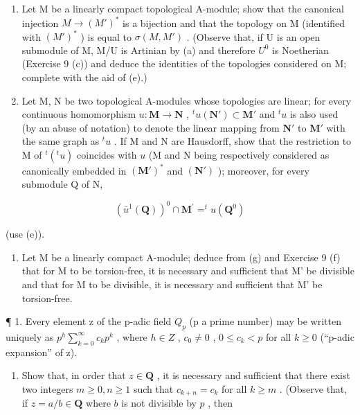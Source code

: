 \begin{enumerate}
\def\labelenumi{(\alph{enumi})}
\setcounter{enumi}{5}
\item
  Let M be a linearly compact topological A-module; show that the canonical injection \(M \rightarrow (M')^{*}\) is a bijection and that the topology on M (identified with \((M')^{*}\) ) is equal to \(\sigma(M, M')\) . (Observe that, if U is an open submodule of M, M/U is Artinian by (a) and therefore \(U^{0}\) is Noetherian (Exercise 9 (c)) and deduce the identities of the topologies considered on M; complete with the aid of (e).)
\item
  Let M, N be two topological A-modules whose topologies are linear; for every continuous homomorphism \(u \colon \mathbf{M} \to \mathbf{N}\) , \(^t u(\mathbf{N}') \subset \mathbf{M}'\) and \(^t u\) is also used (by an abuse of notation) to denote the linear mapping from \(\mathbf{N}'\) to \(\mathbf{M}'\) with the same graph as \(^t u\) . If M and N are Hausdorff, show that the restriction to M of \(^t (^t u)\) coincides with \(u\) (M and N being respectively considered as canonically embedded in \((\mathbf{M}')^*\) and \((\mathbf{N}')\) ); moreover, for every submodule Q of N,
\end{enumerate}

\[
(\bar {u} ^ {1} (\mathbf {Q})) ^ {0} \cap \mathbf {M} ^ {\prime} = ^ {t} u (\mathbf {Q} ^ {0})
\]

(use (e)).

\begin{enumerate}
\def\labelenumi{(\alph{enumi})}
\setcounter{enumi}{7}
\tightlist
\item
  Let M be a linearly compact A-module; deduce from (g) and Exercise 9 (f) that for M to be torsion-free, it is necessary and sufficient that M' be divisible and that for M to be divisible, it is necessary and sufficient that M' be torsion-free.
\end{enumerate}


¶ 1. Every element z of the p-adic field \(Q_{p}\) (p a prime number) may be written uniquely as \(p^{h}\sum_{k=0}^{\infty}c_{k}p^{k}\) , where \(h\in Z\) , \(c_{0}\neq0\) , \(0\leqslant c_{k}<p\) for all \(k\geqslant0\) (``p-adic expansion'' of z).

\begin{enumerate}
\def\labelenumi{(\alph{enumi})}
\tightlist
\item
  Show that, in order that \(z \in \mathbf{Q}\) , it is necessary and sufficient that there exist two integers \(m \geqslant 0, n \geqslant 1\) such that \(c_{k+n} = c_k\) for all \(k \geqslant m\) . (Observe that, if \(z = a / b \in \mathbf{Q}\) where \(b\) is not divisible by \(p\) , then
\end{enumerate}

